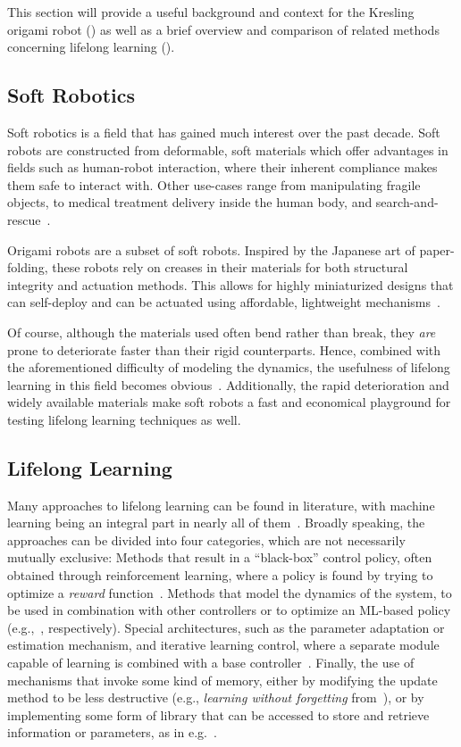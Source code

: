 This section will provide a useful background and context for the Kresling origami robot () as well as a brief overview and comparison of related methods concerning lifelong learning ().

\subsection{Soft Robotics}\label{subsec:soft-robots}
Soft robotics is a field that has gained much interest over the past decade.
Soft robots are constructed from deformable, soft materials which offer advantages in fields such as human-robot interaction, where their inherent compliance makes them safe to interact with.
Other use-cases range from manipulating fragile objects, to medical treatment delivery inside the human body, and search-and-rescue~\parencite{Kim2021,Ze2022,Hawkes2017}.

Origami robots are a subset of soft robots.
Inspired by the Japanese art of paper-folding, these robots rely on creases in their materials for both structural integrity and actuation methods.
This allows for highly miniaturized designs that can self-deploy and can be actuated using affordable, lightweight mechanisms~\parencite{Tang2022a}.

Of course, although the materials used often bend rather than break, they \emph{are} prone to deteriorate faster than their rigid counterparts.
Hence, combined with the aforementioned difficulty of modeling the dynamics, the usefulness of lifelong learning in this field becomes obvious~\parencite{Kim2021}.
Additionally, the rapid deterioration and widely available materials make soft robots a fast and economical playground for testing lifelong learning techniques as well.


\subsection{Lifelong Learning}\label{subsec:lifelong-learning}
Many approaches to lifelong learning can be found in literature, with machine learning being an integral part in nearly all of them~\parencite{Lesort2020}.
Broadly speaking, the approaches can be divided into four categories, which are not necessarily mutually exclusive:
Methods that result in a ``black-box'' control policy, often obtained through reinforcement learning, where a policy is found by trying to optimize a \emph{reward} function~\parencite{Bhagat2019}.
Methods that model the dynamics of the system, to be used in combination with other controllers or to optimize an ML-based policy (e.g.,~\textcite{Gillespie2018,Thuruthel2019}, respectively).
Special architectures, such as the parameter adaptation or estimation mechanism, and iterative learning control, where a separate module capable of learning is combined with a base controller~\parencite{Landau2011, Li2005}.
Finally, the use of mechanisms that invoke some kind of memory, either by modifying the update method to be less destructive (e.g., \emph{learning without forgetting} from~\textcite{Li2016}), or by implementing some form of library that can be accessed to store and retrieve information or parameters, as in e.g.~\textcite{Wang2022}.

